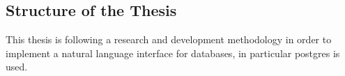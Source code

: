 \documentclass{article}
\begin{document}




\newpage

\subsection{Structure of the Thesis}

This thesis is following a research and development methodology in order to implement a natural language
interface for databases, in particular postgres is used.
\end{document}
